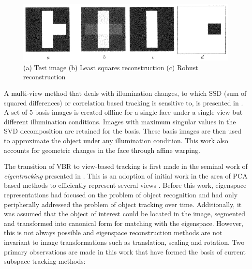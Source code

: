 								\begin{figure}
								\center
								\includegraphics[width=1.0\textwidth]{thesis/TrackingPapers_SubspaceTracking_1998_Black_fig3_nocaption.png}
								\caption{(a) Test image (b) Least squares reconstruction (c) Robust reconstruction \cite{1998_JNL_Eigentracking_Black}}
								\end{figure}

A multi-view method that deals with illumination changes, to which SSD (sum of squared differences) or correlation based tracking is sensitive to, is presented in \cite{1996_TRK_region_Hager}.  A set of 5 basis images is created offline for a single face under a single view but different illumination conditions.  Images with maximum singular values in the SVD decomposition are retained for the basis.  These basis images are then used to approximate the object under any illumination condition.  This work also accounts for geometric changes in the face through affine warping.  

The transition of VBR to view-based tracking is first made in the seminal work of \emph{eigentracking} presented in \cite{1998_JNL_Eigentracking_Black}.  This is an adoption of initial work in the area of PCA based methods to efficiently represent several views \cite{1995_JNL_ActiveModels_Cootes, 1991_CNF_Eigenfaces_Turk}.  Before this work, eigenspace representations had focused on the problem of object recognition and had only peripherally addressed the problem of object tracking over time.  Additionally, it was assumed that the object of interest could be located in the image, segmented and transformed into canonical form for matching with the eigenspace.  However, this is not always possible and eigenspace reconstruction methods are not invariant to image transformations such as translation, scaling and rotation.  Two primary observations are made in this work that have formed the basis of current subspace tracking methods:

